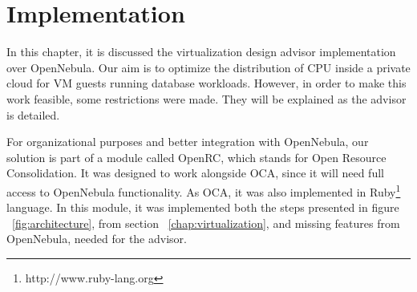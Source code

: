 \chapter{\textbf{Implementation}}

\label{chap:implementation}

In this chapter, it is discussed the virtualization design advisor implementation over OpenNebula. Our aim is to optimize the distribution of CPU inside a private cloud for VM guests running database workloads. However, in order to make this work feasible, some restrictions were made. They will be explained as the advisor is detailed.

For organizational purposes and better integration with OpenNebula, our solution  is part of a module called OpenRC, which stands for Open Resource Consolidation. It was designed to work alongside OCA, since it will need full access to OpenNebula functionality. As OCA, it was also implemented in Ruby\footnote{http://www.ruby-lang.org} language. In this module, it was implemented both the steps presented in figure ~\ref{fig:architecture}, from section ~\ref{chap:virtualization}, and missing features from OpenNebula, needed for the advisor.

